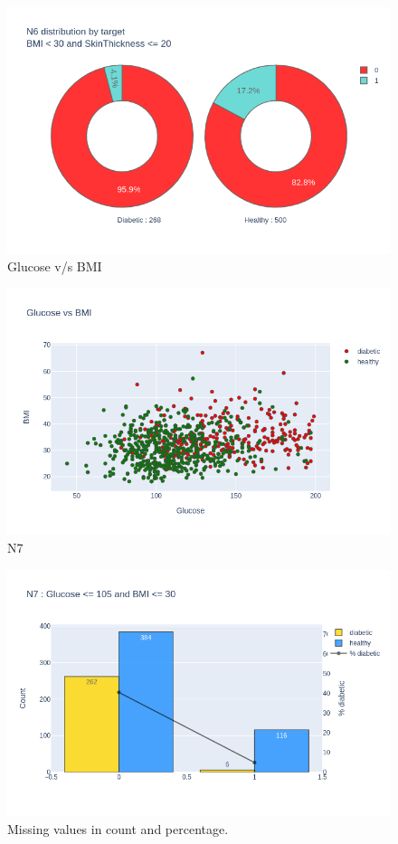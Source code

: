 \documentclass[12pt]{article}
\begin{document}
\begin{figure}[ht]
\centering
\includegraphics[width=1\textwidth]{newplot(27).png}
\caption{Glucose v/s BMI}
\end{figure}

\begin{figure}[ht]
\centering
\includegraphics[width=1\textwidth]{newplot(28).png}
\caption{N7}
\end{figure}

\begin{figure}[ht]
\centering
\includegraphics[width=1\textwidth]{newplot(29).png}
\caption{Missing values in count and percentage.}
\end{figure}
\end{document}

